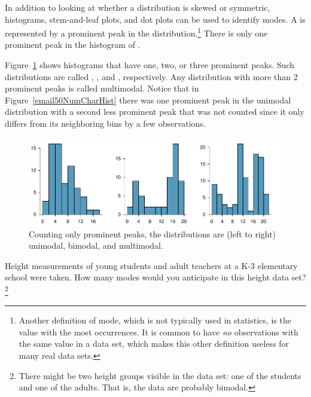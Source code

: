 In addition to looking at whether a distribution is skewed or symmetric, histograms, stem-and-leaf plots, and dot plots can be used to identify modes. A  is represented by a prominent peak in the distribution.\footnote{Another definition of mode, which is not typically used in statistics, is the value with the most occurrences. It is common to have \emph{no} observations with the same value in a data set, which makes this other definition useless for many real data sets.} There is only one prominent peak in the histogram of .

Figure~\ref{singleBiMultiModalPlots} shows histograms that have one, two, or three prominent peaks. Such distributions are called , , and , respectively. Any distribution with more than 2 prominent peaks is called multimodal. Notice that in Figure~\ref{email50NumCharHist} there was one prominent peak in the unimodal distribution with a second less prominent peak that was not counted since it only differs from its neighboring bins by a few observations.

\begin{figure}[h]
   \centering
   \includegraphics[width=\textwidth]{ch_summarizing_data/figures/singleBiMultiModalPlots/singleBiMultiModalPlots}
   \caption{Counting only prominent peaks, the distributions are (left to right) unimodal, bimodal, and multimodal.}
   \label{singleBiMultiModalPlots}
\end{figure}

\begin{exercise}
Height measurements of young students and adult teachers at a K-3 elementary school were taken. How many modes would you anticipate in this height data set?\footnote{There might be two height groups visible in the data set: one of the students and one of the adults. That is, the data are probably bimodal.}
\end{exercise}

